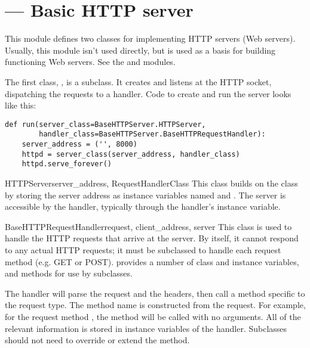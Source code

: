 \section{ ---
         Basic HTTP server}




This module defines two classes for implementing HTTP servers
(Web servers). Usually, this module isn't used directly, but is used
as a basis for building functioning Web servers. See the
 and
 modules.

The first class, , is a
 subclass.  It creates and listens at the
HTTP socket, dispatching the requests to a handler.  Code to create and
run the server looks like this:

\begin{verbatim}
def run(server_class=BaseHTTPServer.HTTPServer,
        handler_class=BaseHTTPServer.BaseHTTPRequestHandler):
    server_address = ('', 8000)
    httpd = server_class(server_address, handler_class)
    httpd.serve_forever()
\end{verbatim}

\begin{classdesc}{HTTPServer}{server_address, RequestHandlerClass}
This class builds on the  class by
storing the server address as instance
variables named  and . The
server is accessible by the handler, typically through the handler's
 instance variable.
\end{classdesc}

\begin{classdesc}{BaseHTTPRequestHandler}{request, client_address, server}
This class is used
to handle the HTTP requests that arrive at the server. By itself,
it cannot respond to any actual HTTP requests; it must be subclassed
to handle each request method (e.g. GET or POST).
 provides a number of class and instance
variables, and methods for use by subclasses.

The handler will parse the request and the headers, then call a
method specific to the request type. The method name is constructed
from the request. For example, for the request method , the
 method will be called with no arguments. All of
the relevant information is stored in instance variables of the
handler.  Subclasses should not need to override or extend the
 method.
\end{classdesc}


